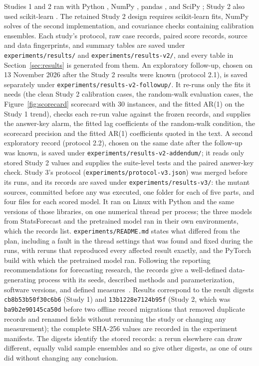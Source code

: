 \documentclass[11pt,a4paper]{article}
\newcommand{\code}[1]{\texttt{#1}}
\begin{document}
Studies 1 and 2 ran with Python \StudyPython, NumPy \StudyNumPy, pandas
\StudyPandas, and SciPy \StudySciPy; Study 2 also used scikit-learn
\StudySklearn. The retained Study 2 design requires \StudySklearnFits{}
scikit-learn fits,
\StudyNumPySolves{} NumPy solves of the second implementation, and \StudyCovarianceChecks{}
covariance checks containing \StudyCalibrationEnsembles{} calibration
ensembles. Each study's protocol, raw case records, paired score records,
source and data fingerprints, and summary tables are saved under
\code{experiments/results/} and \code{experiments/results-v2/}, and every
table in Section~\ref{sec:results} is generated from them. An exploratory
follow-up, chosen on 13 November 2026 after the Study 2 results were known
(protocol 2.1), is saved separately under
\code{experiments/results-v2-followup/}. It re-runs only the fits it
needs (the clean Study 2 calibration cases, the random-walk evaluation
cases, the Figure~\ref{fig:scorecard} scorecard with 30 instances, and the
fitted AR(1) on the Study 1 trend), checks each re-run value against the
frozen records, and supplies the answer-key alarm, the fitted lag
coefficients of the random-walk condition, the scorecard precision and
the fitted AR(1) coefficients quoted in the text. A second exploratory
record (protocol 2.2), chosen on the same date after the follow-up was
known, is saved under \code{experiments/results-v2-addendum/}; it reads
only stored Study 2 values and supplies the suite-level tests and the
paired answer-key check. Study 3's protocol
(\code{experiments/protocol-v3.json}) was merged before its runs, and its
records are saved under \code{experiments/results-v3/}: the
\ThirdMutantSources{} mutant sources, committed before any was executed,
one folder for each of five parts, and four files for each scored model.
It ran on Linux with Python \ThirdPython{} and the same versions of those
libraries, on one numerical thread per process; the three models from StatsForecast and
the pretrained model ran in their own environments, which the records
list. \code{experiments/README.md} states what differed from the plan,
including a fault in the thread settings that was found and fixed during
the runs, with reruns that reproduced every affected result exactly, and
the PyTorch build with which the pretrained model ran.
Following the
reporting recommendations for forecasting research, the records give a
well-defined data-generating process with its seeds, described methods and
parameterization, software versions, and defined
measures~\cite{makridakis2018objectivity}. Results correspond to the result
digests \texttt{cb8b53b50f30c6b6} (Study 1) and \texttt{13b1228e7124b95f}
(Study 2, which was \texttt{ba9b2e90145ca50d} before two offline record
migrations that removed duplicate records and renamed fields without
rerunning the study or changing any measurement); the complete SHA-256 values are recorded
in the experiment manifests. The digests identify the stored records: a rerun elsewhere can draw different, equally valid sample ensembles and so give other digests, as one of ours did without changing any conclusion.
\end{document}
